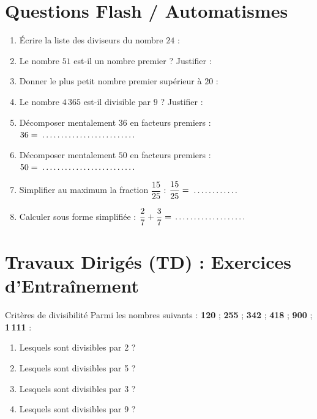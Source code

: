 \section{Questions Flash / Automatismes}

\begin{automatisme}
\begin{enumerate}[label=\textbf{Q\arabic*.}]
    \item Écrire la liste des diviseurs du nombre $24$ : \pointille[6cm]
    \item Le nombre $51$ est-il un nombre premier ? Justifier : \pointille[5cm]
    \item Donner le plus petit nombre premier supérieur à $20$ : \pointille[3cm]
    \item Le nombre $4\,365$ est-il divisible par $9$ ? Justifier : \pointille[5cm]
    \item Décomposer mentalement $36$ en facteurs premiers : $36 = \pointille[4cm]$
    \item Décomposer mentalement $50$ en facteurs premiers : $50 = \pointille[4cm]$
    \item Simplifier au maximum la fraction $\dfrac{15}{25}$ : $\dfrac{15}{25} = \pointille[2cm]$
    \item Calculer sous forme simplifiée : $\dfrac{2}{7} + \dfrac{3}{7} = \pointille[3cm]$
\end{enumerate}
\end{automatisme}

\section{Travaux Dirigés (TD) : Exercices d'Entraînement}

\begin{exercice}[2 pts]{\capSApproprier}{Critères de divisibilité}
Parmi les nombres suivants : \textbf{120} ; \textbf{255} ; \textbf{342} ; \textbf{418} ; \textbf{900} ; \textbf{1\,111} :
\begin{enumerate}
    \item Lesquels sont divisibles par 2 ? \pointille[8cm]
    \item Lesquels sont divisibles par 5 ? \pointille[8cm]
    \item Lesquels sont divisibles par 3 ? \pointille[8cm]
    \item Lesquels sont divisibles par 9 ? \pointille[8cm]
\end{enumerate}
\end{exercice}

